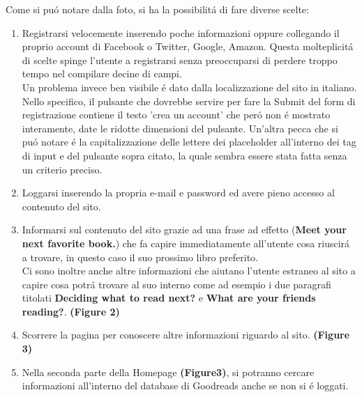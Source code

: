 \documentclass[12pt]{article}
\begin{document}
\begin{flushleft}
Come si pu\'o notare dalla foto, si ha la possibilit\'a di fare diverse scelte:
\begin{enumerate}
	\item Registrarsi velocemente inserendo poche informazioni oppure collegando il proprio account di Facebook o Twitter, Google, Amazon. Questa molteplicit\'a di scelte spinge l'utente a registrarsi senza preoccuparsi di perdere troppo tempo nel compilare decine di campi. \\
	Un problema invece ben visibile \'e dato dalla localizzazione del sito in italiano. Nello specifico, il pulsante che dovrebbe servire per fare la Submit del form di registrazione contiene il testo 'crea un account' che per\'o non \'e mostrato interamente, date le ridotte dimensioni del pulsante. Un'altra pecca che si pu\'o notare \'e la capitalizzazione delle lettere dei placeholder all'interno dei tag di input e del pulsante sopra citato, la quale sembra essere stata fatta senza un criterio preciso.

	\item Loggarsi inserendo la propria e-mail e password ed avere pieno accesso al contenuto del sito.
	
	\item Informarsi sul contenuto del sito grazie ad una frase ad effetto (\textbf{Meet your next favorite book.}) che fa capire immediatamente all'utente cosa riuscir\'a a trovare, in questo caso il suo prossimo libro preferito.\\
	Ci sono inoltre anche altre informazioni che aiutano l'utente estraneo al sito a capire cosa potr\'a trovare al suo interno come ad esempio i due paragrafi titolati \textbf{Deciding what to read next?} e \textbf{What are your friends reading?}. \textbf{(Figure 2)}
	
	\item Scorrere la pagina per conoscere altre informazioni riguardo al sito. \textbf{(Figure 3)}
	
	\item Nella seconda parte della Homepage \textbf{(Figure3)}, si potranno cercare informazioni all'interno del database di Goodreads anche se non si \'e  loggati.
\end{enumerate}

\end{flushleft}
\end{document}
